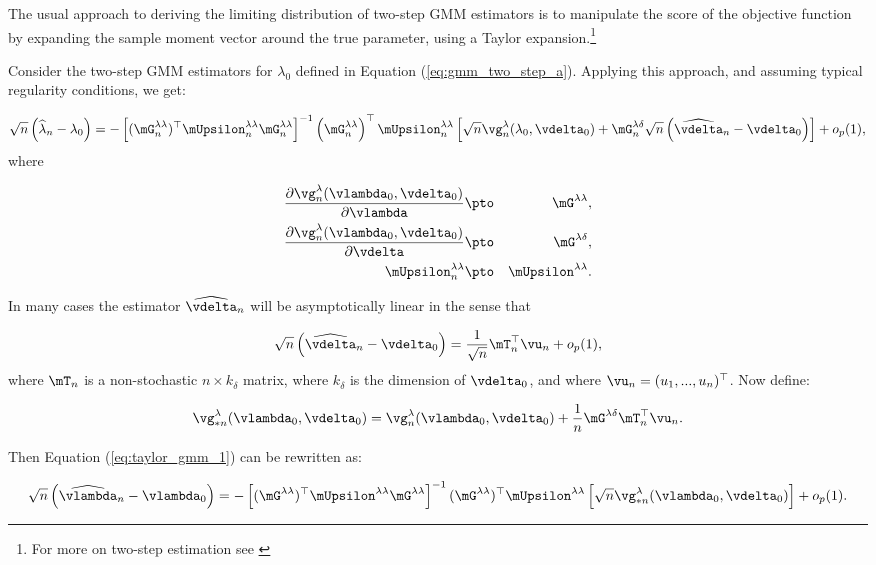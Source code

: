 \documentclass[english,12pt]{book}\usepackage[]{graphicx}\usepackage[]{xcolor}
\begin{document}
The usual approach to deriving the limiting distribution of two-step GMM estimators is to manipulate the score of the objective function by expanding the sample moment vector around the true parameter, using a Taylor expansion.\footnote{For more on two-step estimation see \citet[][section 6]{newey1994large}}

Consider the two-step GMM estimators for $\lambda_0$ defined in Equation (\ref{eq:gmm_two_step_a}). Applying this approach, and assuming typical regularity conditions, we get:

\begin{equation}\label{eq:taylor_gmm_1}
\sqrt{n}\left(\widehat{\lambda}_n - \lambda_0\right) = - \left[(\mG_n^{\lambda\lambda})^\top\mUpsilon_n^{\lambda\lambda}\mG_n^{\lambda\lambda}\right]^{-1}\left(\mG_n^{\lambda\lambda}\right)^\top\mUpsilon_n^{\lambda\lambda}\left[\sqrt{n}\vg_n^{\lambda}(\lambda_0, \vdelta_0) + \mG_n^{\lambda\delta}\sqrt{n}\left(\widehat{\vdelta}_n - \vdelta_0\right)\right] + o_p(1),
\end{equation}
%
where

\begin{eqnarray*}
	\frac{\partial \vg_n^{\lambda}(\vlambda_0, \vdelta_0)}{\partial \vlambda} &\pto&  \mG^{\lambda\lambda}, \\
	\frac{\partial \vg_n^{\lambda}(\vlambda_0, \vdelta_0)}{\partial \vdelta} &\pto&  \mG^{\lambda\delta}, \\
	\mUpsilon^{\lambda\lambda}_n & \pto & \mUpsilon^{\lambda\lambda}.
\end{eqnarray*}

In many cases the estimator $\widehat{\vdelta}_n$ will be asymptotically linear in the sense that

\begin{equation*}
\sqrt{n}\left(\widehat{\vdelta}_n - \vdelta_0\right)=\frac{1}{\sqrt{n}}\mT_n^\top\vu_n + o_p(1),
\end{equation*}
%
where $\mT_n$ is a non-stochastic $n\times k_{\delta}$ matrix, where $k_{\delta}$ is the dimension of $\vdelta_0$, and where $\vu_n = (u_1,...,u_n)^\top$. Now define:

\begin{equation*}
\vg_{*n}^{\lambda}(\vlambda_0, \vdelta_0) = \vg_n^{\lambda}(\vlambda_0, \vdelta_0) + \frac{1}{n}\mG^{\lambda\delta}\mT_n^\top\vu_n.
\end{equation*}

Then Equation (\ref{eq:taylor_gmm_1}) can be rewritten as:

\begin{equation}\label{eq:taylor_gmm_2}
\sqrt{n}\left(\widehat{\vlambda}_n - \vlambda_0\right) = - \left[(\mG^{\lambda\lambda})^\top\mUpsilon^{\lambda\lambda}\mG^{\lambda\lambda}\right]^{-1}(\mG^{\lambda\lambda})^\top\mUpsilon^{\lambda\lambda}\left[\sqrt{n}\vg_{*n}^{\lambda}(\vlambda_0, \vdelta_0) \right] + o_p(1).
\end{equation}
\end{document}
